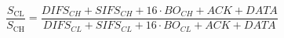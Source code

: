 \documentclass{article}
\begin{document}
\begin{equation}
	\frac{S_\text{CL}}{S_\text{CH}} = \frac{DIFS_{CH}+SIFS_{CH}+16\cdot BO_{CH}+ACK+DATA}{DIFS_{CL}+SIFS_{CL}+16\cdot BO_{CL}+ACK+DATA} 
\end{equation} 
	
\end{document}
